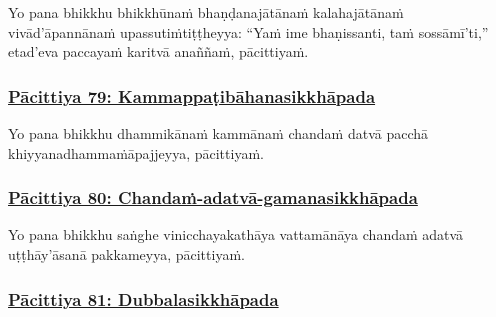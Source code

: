 Yo pana bhikkhu bhikkhūnaṁ bhaṇḍanajātānaṁ kalahajātānaṁ vivād'āpannānaṁ upassutiṁ\makeatletter\hyperlink{endnote404-appendix}\makeatother \thinspace tiṭṭheyya: ``Yaṁ ime bhaṇissanti, taṁ sossāmī'ti,'' etad'eva paccayaṁ karitvā anaññaṁ, pācittiyaṁ.



\subsubsection*{\hyperref[exp79]{Pācittiya 79: Kammappaṭibāhanasikkhāpada}}
\label{pac79}

Yo pana bhikkhu dhammikānaṁ kammānaṁ chandaṁ datvā pacchā khiyyanadhammaṁ\makeatletter\hyperlink{endnote405-appendix}\makeatother \thinspace āpajjeyya, pācittiyaṁ.



\subsubsection*{\hyperref[exp80]{Pācittiya 80: Chandaṁ-adatvā-gamanasikkhāpada}}
\label{pac80}

Yo pana bhikkhu saṅghe vinicchayakathāya vattamānāya chandaṁ adatvā uṭṭhāy'āsanā pakkameyya, pācittiyaṁ.



\subsubsection*{\hyperref[exp81]{Pācittiya 81: Dubbalasikkhāpada}}
\label{pac81}

